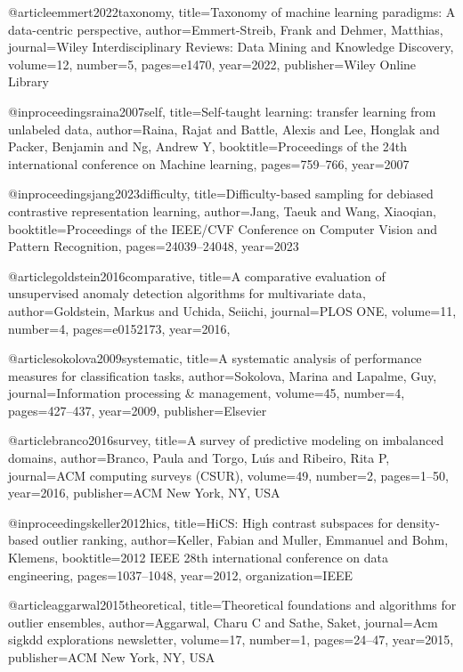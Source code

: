 @article{emmert2022taxonomy,
  title={Taxonomy of machine learning paradigms: A data-centric perspective},
  author={Emmert-Streib, Frank and Dehmer, Matthias},
  journal={Wiley Interdisciplinary Reviews: Data Mining and Knowledge Discovery},
  volume={12},
  number={5},
  pages={e1470},
  year={2022},
  publisher={Wiley Online Library}
}

@inproceedings{raina2007self,
  title={Self-taught learning: transfer learning from unlabeled data},
  author={Raina, Rajat and Battle, Alexis and Lee, Honglak and Packer, Benjamin and Ng, Andrew Y},
  booktitle={Proceedings of the 24th international conference on Machine learning},
  pages={759--766},
  year={2007}
}

@inproceedings{jang2023difficulty,
  title={Difficulty-based sampling for debiased contrastive representation learning},
  author={Jang, Taeuk and Wang, Xiaoqian},
  booktitle={Proceedings of the IEEE/CVF Conference on Computer Vision and Pattern Recognition},
  pages={24039--24048},
  year={2023}
}

@article{goldstein2016comparative,
  title={A comparative evaluation of unsupervised anomaly detection algorithms for multivariate data},
  author={Goldstein, Markus and Uchida, Seiichi},
  journal={{PLOS ONE}},
  volume={11},
  number={4},
  pages={e0152173},
  year={2016},
}

@article{sokolova2009systematic,
  title={A systematic analysis of performance measures for classification tasks},
  author={Sokolova, Marina and Lapalme, Guy},
  journal={Information processing \& management},
  volume={45},
  number={4},
  pages={427--437},
  year={2009},
  publisher={Elsevier}
}

@article{branco2016survey,
  title={A survey of predictive modeling on imbalanced domains},
  author={Branco, Paula and Torgo, Lu{\'\i}s and Ribeiro, Rita P},
  journal={ACM computing surveys (CSUR)},
  volume={49},
  number={2},
  pages={1--50},
  year={2016},
  publisher={ACM New York, NY, USA}
}

@inproceedings{keller2012hics,
  title={HiCS: High contrast subspaces for density-based outlier ranking},
  author={Keller, Fabian and Muller, Emmanuel and Bohm, Klemens},
  booktitle={2012 IEEE 28th international conference on data engineering},
  pages={1037--1048},
  year={2012},
  organization={IEEE}
}


@article{aggarwal2015theoretical,
  title={Theoretical foundations and algorithms for outlier ensembles},
  author={Aggarwal, Charu C and Sathe, Saket},
  journal={Acm sigkdd explorations newsletter},
  volume={17},
  number={1},
  pages={24--47},
  year={2015},
  publisher={ACM New York, NY, USA}
}


